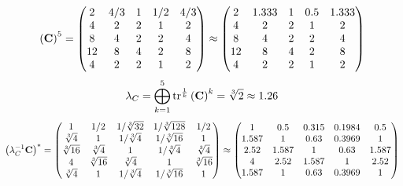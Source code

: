 \documentclass[10pt,a4paper]{article}
\begin{document}
	\[
		\left(\bold{C}\right)^{5} = 
		\begin{pmatrix}
			{{2}}{} & {{4}} / {{3}} & {1}{} & {1} / {{2}} & {{4}} / {{3}} \\
			{{4}}{} & {{2}}{} & {{2}}{} & {1}{} & {{2}}{} \\
			{{8}}{} & {{4}}{} & {{2}}{} & {{2}}{} & {{4}}{} \\
			{{12}}{} & {{8}}{} & {{4}}{} & {{2}}{} & {{8}}{} \\
			{{4}}{} & {{2}}{} & {{2}}{} & {1}{} & {{2}}{} \\
		\end{pmatrix}
		\approx
		\begin{pmatrix}
			2        & 1.333    & 1        & 0.5      & 1.333    \\
			4        & 2        & 2        & 1        & 2        \\
			8        & 4        & 2        & 2        & 4        \\
			12       & 8        & 4        & 2        & 8        \\
			4        & 2        & 2        & 1        & 2        \\
		\end{pmatrix}
	\]
	\[
		\lambda_{C} =  \bigoplus ^{5} _{k = 1} \operatorname{tr} ^{\frac 1 k} \left( \bold{C} \right)^k = {\sqrt[3]{2}}{}\approx 1.26
	\]
	\[
		\left(\lambda_{C}^{-1}\bold{C}\right)^* = 
		\begin{pmatrix}
			{1}{} & {1} / {{2}} & {1} / {\sqrt[3]{32}} & {1} / {\sqrt[3]{128}} & {1} / {{2}} \\
			{\sqrt[3]{4}}{} & {1}{} & {1} / {\sqrt[3]{4}} & {1} / {\sqrt[3]{16}} & {1}{} \\
			{\sqrt[3]{16}}{} & {\sqrt[3]{4}}{} & {1}{} & {1} / {\sqrt[3]{4}} & {\sqrt[3]{4}}{} \\
			{{4}}{} & {\sqrt[3]{16}}{} & {\sqrt[3]{4}}{} & {1}{} & {\sqrt[3]{16}}{} \\
			{\sqrt[3]{4}}{} & {1}{} & {1} / {\sqrt[3]{4}} & {1} / {\sqrt[3]{16}} & {1}{} \\
		\end{pmatrix}
		\approx
		\begin{pmatrix}
			1        & 0.5      & 0.315    & 0.1984   & 0.5      \\
			1.587    & 1        & 0.63     & 0.3969   & 1        \\
			2.52     & 1.587    & 1        & 0.63     & 1.587    \\
			4        & 2.52     & 1.587    & 1        & 2.52     \\
			1.587    & 1        & 0.63     & 0.3969   & 1        \\
		\end{pmatrix}
	\]
\end{document}
